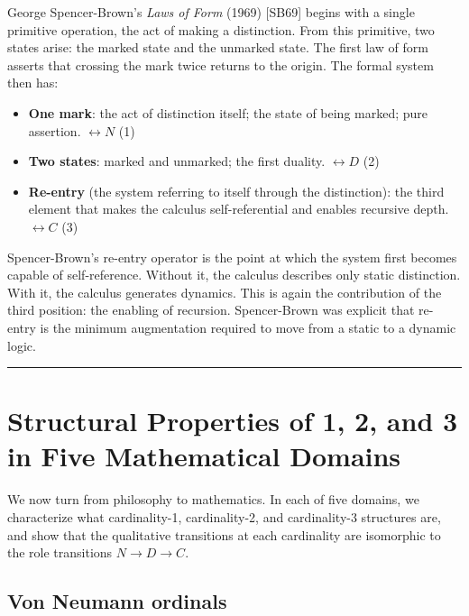 \documentclass[12pt]{article}
\providecommand{\tightlist}{%
  \setlength{\itemsep}{0pt}\setlength{\parskip}{0pt}}
\begin{document}
George Spencer-Brown's \emph{Laws of Form} (1969) {[}SB69{]} begins with
a single primitive operation, the act of making a distinction. From this
primitive, two states arise: the marked state and the unmarked state.
The first law of form asserts that crossing the mark twice returns to
the origin. The formal system then has:

\begin{itemize}
\tightlist
\item
  \textbf{One mark}: the act of distinction itself; the state of being
  marked; pure assertion. \(\leftrightarrow N\) (1)
\item
  \textbf{Two states}: marked and unmarked; the first duality.
  \(\leftrightarrow D\) (2)
\item
  \textbf{Re-entry} (the system referring to itself through the
  distinction): the third element that makes the calculus
  self-referential and enables recursive depth. \(\leftrightarrow C\)
  (3)
\end{itemize}

Spencer-Brown's re-entry operator is the point at which the system first
becomes capable of self-reference. Without it, the calculus describes
only static distinction. With it, the calculus generates dynamics. This
is again the contribution of the third position: the enabling of
recursion. Spencer-Brown was explicit that re-entry is the minimum
augmentation required to move from a static to a dynamic logic.

\begin{center}\rule{0.5\linewidth}{0.5pt}\end{center}

\section{Structural Properties of 1, 2, and 3 in Five Mathematical Domains}\label{structural-properties-of-1-2-and-3-in-five-mathematical-domains}

We now turn from philosophy to mathematics. In each of five domains, we
characterize what cardinality-1, cardinality-2, and cardinality-3
structures are, and show that the qualitative transitions at each
cardinality are isomorphic to the role transitions \(N \to D \to C\).

\subsection{Von Neumann ordinals}\label{von-neumann-ordinals}
\end{document}
